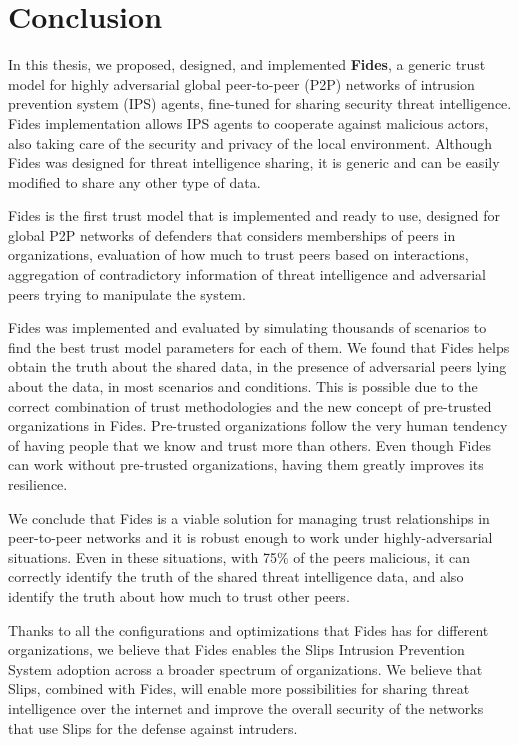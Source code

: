 \chapter{Conclusion}
\label{ch:conclusion}

In this thesis, we proposed, designed, and implemented \textbf{Fides}, a generic trust model for highly adversarial global peer-to-peer (P2P) networks of intrusion prevention system (IPS) agents, fine-tuned for sharing security threat intelligence. Fides implementation allows IPS agents to cooperate against malicious actors, also taking care of the security and privacy of the local environment. 
Although Fides was designed for threat intelligence sharing, it is generic and can be easily modified to share any other type of data. 

Fides is the first trust model that is implemented and ready to use, designed for global P2P networks of defenders that considers memberships of peers in organizations, evaluation of how much to trust peers based on interactions, aggregation of contradictory information of threat intelligence and adversarial peers trying to manipulate the system.

Fides was implemented and evaluated by simulating thousands of scenarios to find the best trust model parameters for each of them. We found that Fides helps obtain the truth about the shared data, in the presence of adversarial peers lying about the data, in most scenarios and conditions. This is possible due to the correct combination of trust methodologies and the new concept of pre-trusted organizations in Fides. Pre-trusted organizations follow the very human tendency of having people that we know and trust more than others. Even though Fides can work without pre-trusted organizations, having them greatly improves its resilience.

We conclude that Fides is a viable solution for managing trust relationships in peer-to-peer networks and it is robust enough to work under highly-adversarial situations. Even in these situations, with 75\% of the peers malicious, it can correctly identify the truth of the shared threat intelligence data, and also identify the truth about how much to trust other peers.

Thanks to all the configurations and optimizations that Fides has for different organizations, we believe that Fides enables the Slips Intrusion Prevention System adoption across a broader spectrum of organizations.
We believe that Slips, combined with Fides, will enable more possibilities for sharing threat intelligence over the internet and improve the overall security of the networks that use Slips for the defense against intruders.


